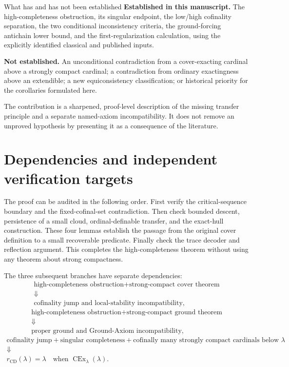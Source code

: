 \documentclass[11pt,letterpaper]{article}
\theoremstyle{definition}
\newcommand{\CEx}{\operatorname{CEx}}
\newcommand{\rcomp}{r_{\mathrm{CD}}}
\begin{document}
\begin{assessment}{What has and has not been established}
\textbf{Established in this manuscript.} The high-completeness obstruction, its singular endpoint, the low/high cofinality separation, the two conditional inconsistency criteria, the ground-forcing antichain lower bound, and the first-regularization calculation, using the explicitly identified classical and published inputs.

\textbf{Not established.} An unconditional contradiction from a cover-exacting cardinal above a strongly compact cardinal; a contradiction from ordinary exactingness above an extendible; a new equiconsistency classification; or historical priority for the corollaries formulated here.

The contribution is a sharpened, proof-level description of the missing transfer principle and a separate named-axiom incompatibility. It does not remove an unproved hypothesis by presenting it as a consequence of the literature.
\end{assessment}

\appendix
\section{Dependencies and independent verification targets}\label{app:dependencies}

The proof can be audited in the following order. First verify the critical-sequence boundary and the fixed-cofinal-set contradiction. Then check bounded descent, persistence of a small cloud, ordinal-definable transfer, and the exact-hull construction. These four lemmas establish the passage from the original cover definition to a small recoverable predicate. Finally check the trace decoder and reflection argument. This completes the high-completeness theorem without using any theorem about strong compactness.

The three subsequent branches have separate dependencies:
\[
\begin{array}{c}
\text{high-completeness obstruction}
  +\text{strong-compact cover theorem}\\[2pt]
\Downarrow\\[-1pt]
\text{cofinality jump and local-stability incompatibility},
\end{array}
\]
\[
\begin{array}{c}
\text{high-completeness obstruction}
  +\text{strong-compact ground theorem}\\[2pt]
\Downarrow\\[-1pt]
\text{proper ground and Ground-Axiom incompatibility},
\end{array}
\]
\[
\begin{array}{c}
\text{cofinality jump}
  +\text{singular completeness}
  +\text{cofinally many strongly compact cardinals below }\lambda\\[2pt]
\Downarrow\\[-1pt]
\rcomp(\lambda)=\lambda
  \quad\text{when }\CEx_\lambda(\lambda).
\end{array}
\]
\end{document}
